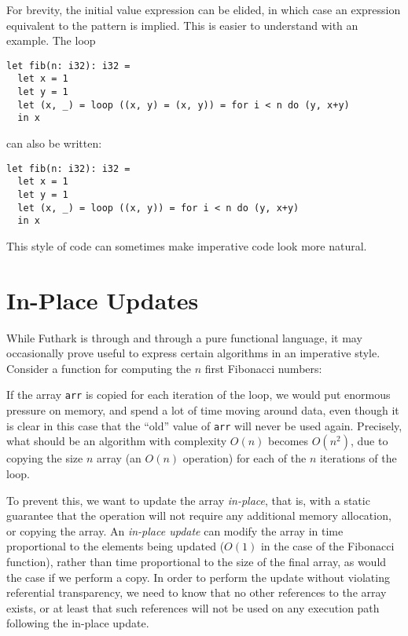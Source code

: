 \documentclass[oneside,11pt]{book}
\newenvironment{wrap}{\vspace{\topskip}\par\noindent\begin{minipage}{\linewidth}}{\end{minipage}\par}
\newcommand{\inplisting}[1]{\begin{wrap}\end{wrap}}
\begin{document}
For brevity, the initial value expression can be elided, in which case
an expression equivalent to the pattern is implied.  This is easier to
understand with an example.  The loop

\begin{lstlisting}
let fib(n: i32): i32 =
  let x = 1
  let y = 1
  let (x, _) = loop ((x, y) = (x, y)) = for i < n do (y, x+y)
  in x
\end{lstlisting}

\noindent
can also be written:

\begin{lstlisting}
let fib(n: i32): i32 =
  let x = 1
  let y = 1
  let (x, _) = loop ((x, y)) = for i < n do (y, x+y)
  in x
\end{lstlisting}

\noindent
This style of code can sometimes make imperative code look more natural.

\section{In-Place Updates}
\label{sec:in-place-updates}

While Futhark is through and through a pure functional language, it
may occasionally prove useful to express certain algorithms in an
imperative style.  Consider a function for computing the $n$ first
Fibonacci numbers:

\inplisting{src/fib_sequential.fut}

If the array \texttt{arr} is copied for each iteration of the loop, we
would put enormous pressure on memory, and spend a lot of time moving
around data, even though it is clear in this case that the ``old''
value of \texttt{arr} will never be used again.  Precisely, what
should be an algorithm with complexity $O(n)$ becomes $O(n^2)$, due to
copying the size $n$ array (an $O(n)$ operation) for each of the $n$
iterations of the loop.

To prevent this, we want to update the array \textit{in-place}, that
is, with a static guarantee that the operation will not require any
additional memory allocation, or copying the array.  An
\textit{in-place update} can modify the array in time proportional to
the elements being updated ($O(1)$ in the case of the Fibonacci
function), rather than time proportional to the size of the final
array, as would the case if we perform a copy.  In order to perform
the update without violating referential transparency, we need to know
that no other references to the array exists, or at least that such
references will not be used on any execution path following the
in-place update.
\end{document}
